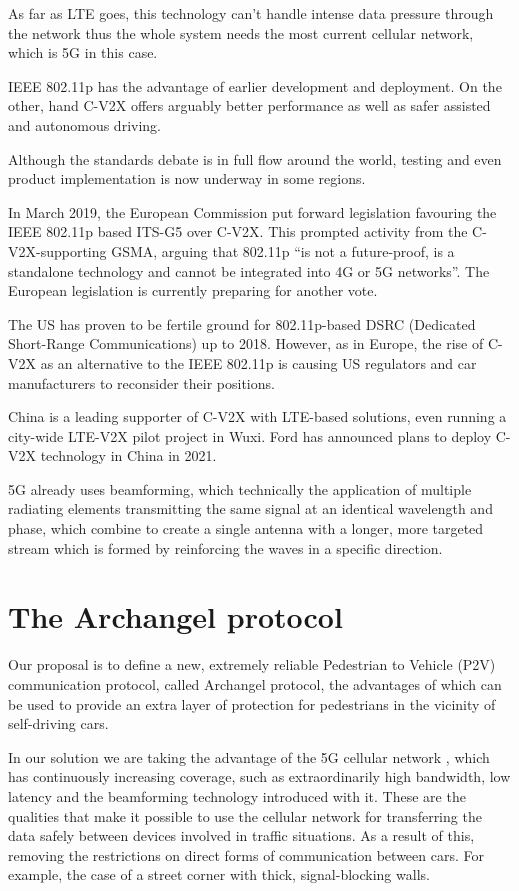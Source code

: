 \documentclass[conference]{IEEEtran}
\begin{document}
As far as LTE goes, this technology can’t handle intense data pressure through the network thus the whole system needs the most current cellular network, which is 5G in this case.

IEEE 802.11p has the advantage of earlier development and deployment. On the other, hand C-V2X offers arguably better performance as well as safer assisted and autonomous driving.

Although the standards debate is in full flow around the world, testing and even product implementation is now underway in some regions.

In March 2019, the European Commission put forward legislation favouring the IEEE 802.11p based ITS-G5 over C-V2X. This prompted activity from the C-V2X-supporting GSMA, arguing that 802.11p “is not a future-proof, is a standalone technology and cannot be integrated into 4G or 5G networks”. The European legislation is currently preparing for another vote.

The US has proven to be fertile ground for 802.11p-based DSRC (Dedicated Short-Range Communications) up to 2018. However,  as in Europe, the rise of C-V2X as an alternative to the IEEE 802.11p is causing US regulators and car manufacturers to reconsider their positions.

China is a leading supporter of C-V2X with LTE-based solutions, even running a city-wide LTE-V2X pilot project in Wuxi. Ford has announced plans to deploy C-V2X technology in China in 2021.

5G already uses beamforming, which technically the application of multiple radiating elements transmitting the same signal at an identical wavelength and phase, which combine to create a single antenna with a longer, more targeted stream which is formed by reinforcing the waves in a specific direction. \cite{b3}

\section{The Archangel protocol}
Our proposal is to define a new, extremely reliable Pedestrian to Vehicle (P2V) communication protocol, called Archangel protocol, the advantages of which can be used to provide an extra layer of protection for pedestrians in the vicinity of self-driving cars.

In our solution we are taking the advantage of the 5G cellular network \cite{b4,b5}, which has continuously increasing coverage, such as extraordinarily high bandwidth, low latency and the beamforming technology introduced with it. These are the qualities that make it possible to use the cellular network for transferring the data safely between devices involved in traffic situations. As a result of this, removing the restrictions on direct forms of communication between cars. For example, the case of a street corner with thick, signal-blocking walls.
\end{document}
